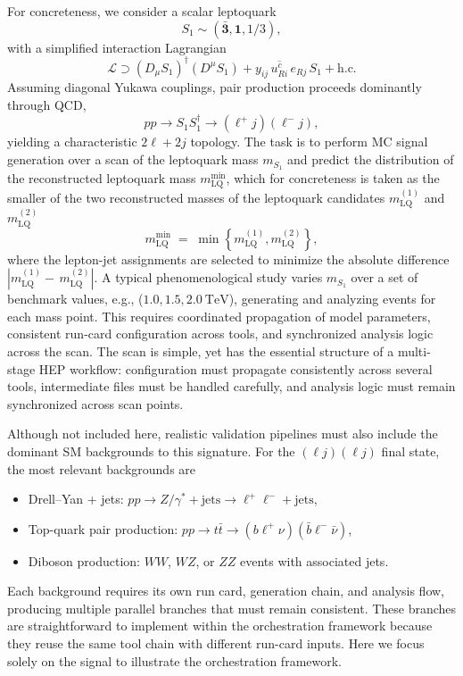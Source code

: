 \documentclass[11pt,oneside]{article}
\numberwithin{equation}{section}
\begin{document}
For concreteness, we consider a scalar leptoquark~\cite{Dorsner:2016wpm}
\begin{equation}
S_1 \sim (\bar{\mathbf{3}}, \mathbf{1}, 1/3),
\end{equation}
with a simplified interaction Lagrangian
\begin{equation}
\mathcal{L} \supset 
(D_\mu S_1)^\dagger (D^\mu S_1)
+ y_{ij}\,\overline{u^c_{Ri}}\, e_{Rj}\, S_1
+ \mathrm{h.c.}
\end{equation}
Assuming diagonal Yukawa couplings, pair production proceeds dominantly through QCD,
\begin{equation}
pp \to S_1 S_1^\dagger \to (\ell^+ j)(\ell^- j),
\end{equation}
yielding a characteristic \(2\ell + 2j\) topology. 
The task is to perform MC signal generation over a scan of the leptoquark mass $m_{S_1}$ and predict the distribution of the reconstructed leptoquark mass $m^{\text{min}}_{\text{LQ}}$, which for concreteness is taken as the smaller of the two reconstructed masses of the leptoquark candidates $m_{\text{LQ}}^{(1)}$ and $m_{\text{LQ}}^{(2)}$
\begin{equation}
m^{\min}_{\text{LQ}} \;=\;
\min\left\{m_{\text{LQ}}^{(1)}, m_{\text{LQ}}^{(2)}\right\},
\end{equation}
where the lepton-jet assignments are selected to minimize the absolute difference
$\left|m_{\text{LQ}}^{(1)} - \, m_{\text{LQ}}^{(2)}\right|$.
A typical phenomenological study varies $m_{S_1}$ over a set of benchmark values, e.g., ($1.0, 1.5, 2.0~\mathrm{TeV}$), generating and analyzing events for each mass point. 
This requires coordinated propagation of model parameters, consistent run-card configuration across tools, and synchronized analysis logic across the scan. 
The scan is simple, yet has the essential structure of a multi-stage HEP workflow: configuration must propagate consistently across several tools, intermediate files must be handled carefully, and analysis logic must remain synchronized across scan points. 

Although not included here, realistic validation pipelines must also include the dominant SM backgrounds to this signature. For the $(\ell j)(\ell j)$ final state, the most relevant backgrounds are
\begin{itemize}
    \item Drell--Yan + jets: $pp \to Z/\gamma^\ast + \mathrm{jets} \to \ell^+\ell^- + \mathrm{jets}$,
    \item Top-quark pair production: $pp \to t\bar{t} \to (b\ell^+\nu)(\bar{b}\ell^-\bar{\nu})$,
    \item Diboson production: $WW$, $WZ$, or $ZZ$ events with associated jets.
\end{itemize}
Each background requires its own run card, generation chain, and analysis flow, producing multiple parallel branches that must remain consistent. 
These branches are straightforward to implement within the orchestration framework because they reuse the same tool chain with different run-card inputs.
Here we focus solely on the signal to illustrate the orchestration framework.
\end{document}
